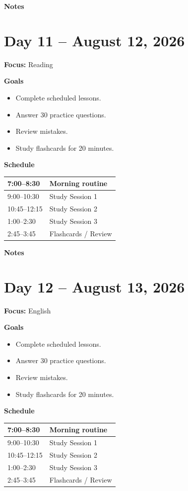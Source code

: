 \vspace{1em}
\textbf{Notes}

\vspace{8cm}

\newpage

\section*{Day 11 -- August 12, 2026}
\textbf{Focus:} Reading

\textbf{Goals}
\begin{itemize}
\item Complete scheduled lessons.
\item Answer 30 practice questions.
\item Review mistakes.
\item Study flashcards for 20 minutes.
\end{itemize}

\textbf{Schedule}
\begin{tabular}{|p{4cm}|p{10cm}|}\hline
7:00--8:30 & Morning routine \\\hline
9:00--10:30 & Study Session 1 \\\hline
10:45--12:15 & Study Session 2 \\\hline
1:00--2:30 & Study Session 3 \\\hline
2:45--3:45 & Flashcards / Review \\\hline
\end{tabular}

\vspace{1em}
\textbf{Notes}

\vspace{8cm}

\newpage

\section*{Day 12 -- August 13, 2026}
\textbf{Focus:} English

\textbf{Goals}
\begin{itemize}
\item Complete scheduled lessons.
\item Answer 30 practice questions.
\item Review mistakes.
\item Study flashcards for 20 minutes.
\end{itemize}

\textbf{Schedule}
\begin{tabular}{|p{4cm}|p{10cm}|}\hline
7:00--8:30 & Morning routine \\\hline
9:00--10:30 & Study Session 1 \\\hline
10:45--12:15 & Study Session 2 \\\hline
1:00--2:30 & Study Session 3 \\\hline
2:45--3:45 & Flashcards / Review \\\hline
\end{tabular}

